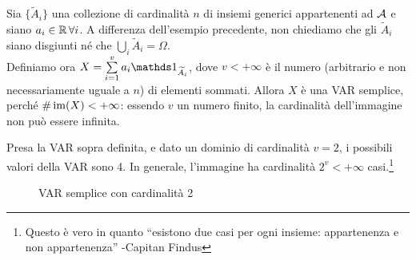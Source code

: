 \smallskip
\begin{nb}
    Sia $\{\widetilde A_i\}$ una collezione di cardinalità $n$ di insiemi generici appartenenti ad $\mathcal A$ e siano $a_i \in \mathbb R \, \forall i$.
    A differenza dell'esempio precedente, non chiediamo che gli $\widetilde A_i$ siano disgiunti né che $\bigcup_i \widetilde A_i = \Omega$. \\
    Definiamo ora $X = \sum\limits_{i = 1}^{v} a_i \Ind_{\widetilde A_i}$,    dove $v < +\infty$ è il numero (arbitrario e non necessariamente uguale a $n$) di elementi sommati.
    Allora $X$ è una VAR semplice, perché $\#\operatorname{im}(X) < +\infty$: essendo $v$ un numero finito, la cardinalità dell'immagine non può essere infinita.
\end{nb}

\smallskip
\begin{ese}
  Presa la VAR sopra definita, e dato un dominio di cardinalità $v = 2$, i possibili valori della VAR sono 4.
  In generale, l'immagine ha cardinalità $2^v < +\infty$ casi.\footnote{Questo è vero in quanto
	``esistono due casi per ogni insieme: appartenenza e non appartenenza'' -Capitan Findus}

  \begin{figure}[H]
    \centering
    \def\firstcircle{(0,0) circle (1.2cm)}
    \def\secondcircle{(-35:1.5cm) circle (1.2cm)}
    \def\drect {(-1.5,-2.5) rectangle (3,1.7)}
    \caption{VAR semplice con cardinalità 2}
    \label{VAR_semplice_val}
  \end{figure}
\end{ese}

